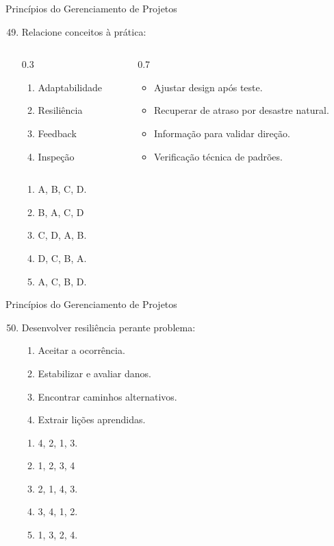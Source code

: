 \documentclass{beamer}
\begin{document}
\begin{frame}{Princípios do Gerenciamento de Projetos}
	\begin{enumerate}
		\setcounter{enumi}{48}
		\justifying
		\item Relacione conceitos à prática:
		\begin{columns}
			\begin{column}{0.3\textwidth}
				\begin{enumerate}[A]
					\item Adaptabilidade
					\item Resiliência
					\item Feedback
					\item Inspeção
				\end{enumerate}
			\end{column}
			\begin{column}{0.7\textwidth}
				\begin{itemize}
					\item Ajustar design após teste.
					\item Recuperar de atraso por desastre natural.
					\item Informação para validar direção.
					\item Verificação técnica de padrões.
				\end{itemize}
			\end{column}
		\end{columns}
		\begin{enumerate}[a]
			\item A, B, C, D.
			\item \alert<2>{B, A, C, D}
			\item C, D, A, B.
			\item D, C, B, A.
			\item A, C, B, D.
		\end{enumerate}
	\end{enumerate}
\end{frame}

\begin{frame}{Princípios do Gerenciamento de Projetos}
	\begin{enumerate}
		\setcounter{enumi}{49}
		\justifying
		\item Desenvolver resiliência perante problema:
		\begin{enumerate}[I]
			\item Aceitar a ocorrência.
			\item Estabilizar e avaliar danos.
			\item Encontrar caminhos alternativos.
			\item Extrair lições aprendidas.
		\end{enumerate}
		\begin{enumerate}[a]
			\item 4, 2, 1, 3.
			\item \alert<2>{1, 2, 3, 4}
			\item 2, 1, 4, 3.
			\item 3, 4, 1, 2.
			\item 1, 3, 2, 4.
		\end{enumerate}
	\end{enumerate}
\end{frame}
\end{document}
